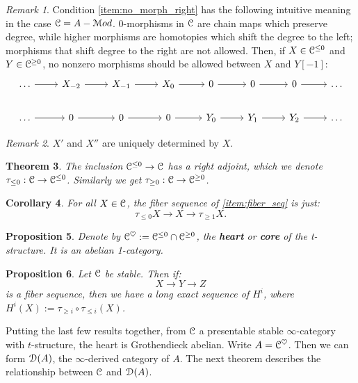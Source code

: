 \documentclass[10pt,a4paper,reqno,oneside]{book} %
\theoremstyle{plain}
\newtheorem{thm}{Theorem}[section]
\newtheorem{prop}[thm]{Proposition}
\newtheorem{cor}[thm]{Corollary}
\theoremstyle{definition}
\theoremstyle{remark}
\newtheorem{rem}[thm]{Remark}
\numberwithin{equation}{section}
\begin{document}
\begin{rem}
Condition \ref{item:no_morph_right} has the following intuitive meaning in the case $\mathcal C = A-\mathcal M od$. $0$-morphisms in 
$\mathcal C$ are chain maps which preserve degree, while
higher morphisms are homotopies which shift the degree to the left; morphisms that shift degree to the right are not allowed.
Then, if $X \in \mathcal C^{\leq 0}$ and $Y \in \mathcal C^{\geq 0}$, no nonzero morphisms should be allowed between $X$ and $Y[-1]$:
\[
\begin{tikzcd}
\dots \arrow{r} & X_{-2} \arrow{r} & X_{-1} \arrow{r} & X_0 \arrow{r} & 0\arrow{r} & 0\arrow{r} & 0\arrow{r} & \dots \\
\dots \arrow{r} & 0 \arrow{r} & 0 \arrow{r} & 0 \arrow{r} & Y_0\arrow{r} & Y_1\arrow{r} & Y_2\arrow{r}  & \dots
\end{tikzcd}
\]
\end{rem}

\begin{rem}
$X'$ and $X''$ are uniquely determined by $X$.
\end{rem}

\begin{thm}
The inclusion $\mathcal C^{\leq 0} \to \mathcal C$ has a right adjoint, which we denote $\tau_{\leq 0} : \mathcal C \to \mathcal C^{\leq 0}$. Similarly
we get $\tau_{\geq 0} : \mathcal C \to \mathcal C^{\geq 0}$.
\end{thm}

\begin{cor}
For all $X \in \mathcal C$, the fiber sequence of \ref{item:fiber_seq} is just:
\[	\tau_{\leq 0} X \to X \to \tau_{\geq 1} X.	\]
\end{cor}

\begin{prop}
Denote by $\mathcal C^{\heartsuit} := \mathcal C^{\leq 0} \cap \mathcal C^{\geq 0}$, the \textbf{heart} or \textbf{core} of the t-structure. 
It is an abelian 1-category.
\end{prop}

\begin{prop}
\label{prop:stable_les_homology}
Let $\mathcal C$ be stable. Then if:
\[	X \to Y \to Z	\]
is a fiber sequence, then we have a long exact sequence of $H^i$, where $H^i(X) := \tau_{\geq i} \circ \tau_{\leq i} (X)$.
\end{prop}

Putting the last few results together, from $\mathcal C$ a presentable stable $\infty$-category with $t$-structure, the heart 
is Grothendieck abelian. Write $A = \mathcal C^{\heartsuit}$. Then we can form $\mathcal D(A)$, the $\infty$-derived category of $A$.
The next theorem describes the relationship between $\mathcal C$ and $\mathcal D(A)$.
\end{document}
